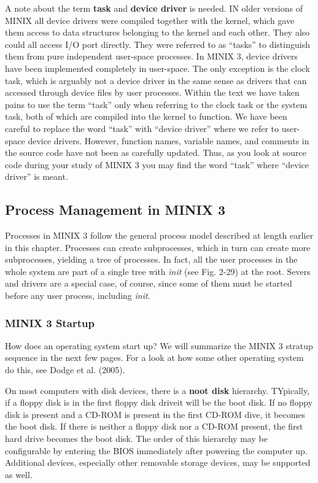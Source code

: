 \documentclass{book}
\newcommand {\kw}  [1] {\textbf{#1}}
\newcommand {\sys} [1] {\textsl{#1}}
\begin{document}
A note about the term \kw{task} and \kw{device driver} is needed.
IN older versions of MINIX all device drivers were compiled together with the kernel,
which gave them access to data structures belonging to the kernel and each other.
They also could all access I/O port directly.
They were referred to as ``tasks'' to distinguish them from pure independent user-space processes.
In MINIX 3, device drivers have been implemented completely in user-space.
The only exception is the clock task, which is arguably not a device driver in the same sense as drivers 
that can accessed through device files by user processes.
Within the text we have taken pains to use the term ``task'' only when referring to the clock task or the system task,
both of which are compiled into the kernel to function.
We have been careful to replace the word ``task'' with ``device driver'' where we refer to user-space device drivers.
However, function names, variable names, and comments in the source code have not been as carefully updated.
Thus, as you look at source code during your study of MINIX 3 you may find the word ``task'' where ``device driver'' is meant. 

\subsection{Process Management in MINIX 3}
Processes in MINIX 3 follow the general process model described at length earlier in this chapter.
Processes can create subprocesses, which in turn can create more subprocesses, yielding a tree of processes.
In fact, all the user processes in the whole system are part of a single tree with \sys{init} (see Fig. 2-29) at the root.
Severs and drivers are a special case, of course, since some of them must be started before any user process, including \sys{init}.

\subsubsection*{MINIX 3 Startup}
How does an operating system start up?
We will summarize the MINIX 3 stratup sequence in the next few pages.
For a look at how some other operating system do this, see Dodge et al. (2005).

On most computers with disk devices, there is a \kw{noot disk} hierarchy.
TYpically, if a floppy disk is in the first floppy disk driveit will be the boot disk.
If no floppy disk is present and a CD-ROM is present in the first CD-ROM dive, it becomes the boot disk.
If there is neither a floppy disk nor a CD-ROM present, the first hard drive becomes the boot disk.
The order of this hierarchy may be configurable by entering the BIOS immediately after powering the computer up.
Additional devices, especially other removable storage devices, may be supported as well.
\end{document}

